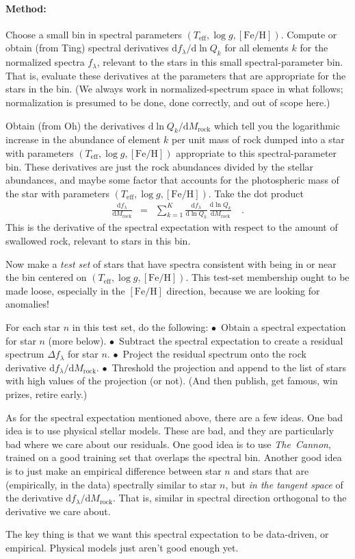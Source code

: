 \documentclass[12pt]{article}
\newcommand{\project}[1]{\textsl{#1}}
\newcommand{\TheCannon}{\project{The~Cannon}}
\newcommand{\dd}{\mathrm{d}}
\newcommand{\teff}{T_{\mathrm{eff}}}
\newcommand{\logg}{\log g}
\newcommand{\feh}{[\mathrm{Fe}/\mathrm{H}]}
\newcommand{\rock}{\mathrm{rock}}
\begin{document}
\paragraph{Method:}
Choose a small bin in spectral parameters $(\teff, \logg, \feh)$.
Compute or obtain (from Ting) spectral derivatives $\dd f_\lambda/\dd\ln Q_k$ for
all elements $k$ for the normalized spectra $f_\lambda$, relevant
to the stars in this small spectral-parameter bin.
That is, evaluate these derivatives at the parameters that are
appropriate for the stars in the bin.
(We always work in normalized-spectrum space in what follows; normalization
is presumed to be done, done correctly, and out of scope here.)

Obtain (from Oh) the derivatives $\dd\ln Q_k/\dd M_\rock$ which tell
you the logarithmic increase in the abundance of element $k$ per unit
mass of rock dumped into a star with parameters $(\teff, \logg, \feh)$
appropriate to this spectral-parameter bin.
These derivatives are just the rock abundances divided by the stellar
abundances, and maybe some factor that accounts for the photospheric
mass of the star with parameters $(\teff, \logg, \feh)$.
Take the dot product
\begin{eqnarray}
  \frac{\dd f_\lambda}{\dd M_\rock} &=&
  \sum_{k=1}^K \frac{\dd f_\lambda}{\dd\ln Q_k}\,\frac{\dd\ln Q_k}{\dd M_\rock}
  \quad .
\end{eqnarray}
This is the derivative of the spectral expectation with respect to
the amount of swallowed rock, relevant to stars in this bin.

Now make a \emph{test set} of
stars that have spectra consistent with being in or near
the bin centered on $(\teff, \logg, \feh)$.
This test-set membership ought to be made loose, especially in the $\feh$
direction, because we are looking for anomalies!

For each star $n$ in this test set, do the following:
$\bullet$~Obtain a spectral expectation for star $n$ (more below).
$\bullet$~Subtract the spectral expectation to create a residual spectrum
          $\Delta f_\lambda$ for star $n$.
$\bullet$~Project the residual spectrum onto the rock derivative
          $\dd f_\lambda / \dd M_\rock$.
$\bullet$~Threshold the projection and append to the list of stars with
          high values of the projection (or not).
(And then publish, get famous, win prizes, retire early.)

As for the spectral expectation mentioned above, there are a few ideas.
One bad idea is to use physical stellar models. These are bad, and they
are particularly bad where we care about our residuals. One good idea
is to use \TheCannon, trained on a good training set that overlaps the
spectral bin.
Another good idea is to just make an empirical difference between star
$n$ and stars that are (empirically, in the data) spectrally similar to
star $n$, but \emph{in the tangent space} of the derivative 
${\dd f_\lambda}/{\dd M_\rock}$.
That is, similar in spectral direction orthogonal to the derivative we
care about.

The key thing is that we want this spectral expectation to be data-driven,
or empirical.
Physical models just aren't good enough yet.
\end{document}
